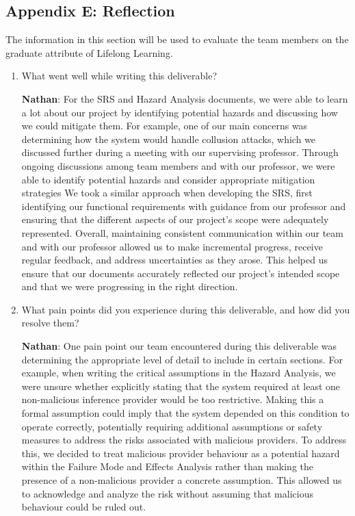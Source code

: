 \documentclass[12pt]{article}
\begin{document}
\subsection{Appendix E: Reflection}


The information in this section will be used to evaluate the team members on the
graduate attribute of Lifelong Learning.  

\begin{enumerate}
  \item What went well while writing this deliverable?
  
  \textbf {Nathan}: For the SRS and Hazard Analysis documents, we were able to learn a lot about our project by identifying potential hazards and discussing how we could mitigate them. For example, one of our main concerns was determining how the system would handle collusion attacks, which we discussed further during a meeting with our supervising professor. Through ongoing discussions among team members and with our professor, we were able to identify potential hazards and consider appropriate mitigation strategies
   We took a similar approach when developing the SRS, first identifying our functional requirements with guidance from our professor and ensuring that the different aspects of our project's scope were adequately represented. Overall, maintaining consistent communication within our team and with our professor allowed us to make incremental progress, receive regular feedback, and address uncertainties as they arose. This helped us ensure that our documents accurately reflected our project's intended scope and that we were progressing in the right direction.

  \item What pain points did you experience during this deliverable, and how did
  you resolve them?

  \textbf{Nathan}: One pain point our team encountered during this deliverable was determining the appropriate level of detail to include in certain sections. For example, when writing the critical assumptions in the Hazard Analysis, we were unsure whether explicitly stating that the system required at least one non-malicious inference provider would be too restrictive. Making this a formal assumption could imply that the system depended on this condition to operate correctly, potentially requiring additional assumptions or safety measures to address the risks associated with malicious providers. To address this, we decided to treat malicious provider behaviour as a potential hazard within the Failure Mode and Effects Analysis rather than making the presence of a non-malicious provider a concrete assumption. This allowed us to acknowledge and analyze the risk without assuming that malicious behaviour could be ruled out.


\end{enumerate}
\end{document}
